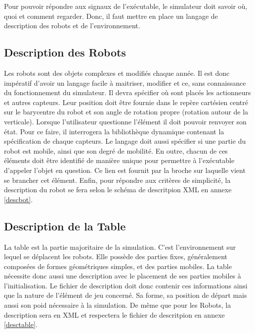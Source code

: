Pour pouvoir répondre aux signaux de l'exécutable, le simulateur doit savoir où, quoi et comment regarder. Donc, il faut mettre en place un langage de description des robots et de l'environnement.

\label{langdesc}

\subsection{Description des Robots}

\label{desc_robot}

Les robots sont des objets complexes et modifiés chaque année. Il est donc impératif d'avoir un langage facile à maitriser, modifier et ce, sans connaissance du fonctionnement du simulateur. Il devra spécifier où sont placés les actionneurs et autres capteurs. Leur position doit être fournie dans le repère cartésien centré sur le barycentre du robot et son angle de rotation propre (rotation autour de la verticale). Lorsque l'utilisateur questionne l'élément il doit pouvoir renvoyer son état. Pour ce faire, il interrogera la bibliothèque dynamique contenant la spécification de chaque capteurs. Le langage doit aussi spécifier si une partie du robot est mobile, ainsi que son degré de mobilité. En outre, chacun de ces éléments doit être identifié de manière unique pour permettre à l'exécutable d'appeler l'objet en question. Ce lien est fournit par la broche sur laquelle vient se brancher cet élément. Enfin, pour répondre aux critères de simplicité, la description du robot se fera selon le schéma de descritpion XML en annexe \ref{descbot}.

\subsection{Description de la Table}

La table est la partie majoritaire de la simulation. C'est l'environnement sur lequel se déplacent les robots. Elle possède des parties fixes, généralement composées de formes géométriques simples, et des parties mobiles. La table nécessite donc aussi une description avec le placement de ses parties mobiles à l'initialisation. Le fichier de description doit donc contenir ces informations ainsi que la nature de l'élément de jeu concerné. Sa forme, sa position de départ mais aussi son poid nécessaire à la simulation. De même que pour les Robots, la description sera en XML et respectera le fichier de descritpion en annexe \ref{desctable}.

